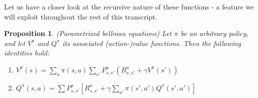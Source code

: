 \documentclass[11pt]{article} %
\newtheorem{prop}{Proposition}
\begin{document}
Let us have a closer look at the recursive nature of these functions - a feature we will exploit throughout the rest of this transcript.

\begin{prop}{(Parametrized bellman equations)}
	Let $\pi$ be an arbitrary policy, and let $V^{\pi}$ and $Q^{\pi}$ its associated (action-)value functions. Then the following identities hold:
	\begin{enumerate}
		\item $V^{\pi}(s) = \sum_{a} \pi(s,a) \sum_{s'} P_{s,s'}^a ( R_{s,s'}^a + \gamma V^{\pi}(s') ) $
		\item $Q^{\pi}(s,a) = \sum P_{s,s'}^a [ R_{s,s'}^a + \gamma \sum_{a'} \pi(s',a') Q^{\pi}(s',a') ] $
	\end{enumerate}
\end{prop}
\end{document}
